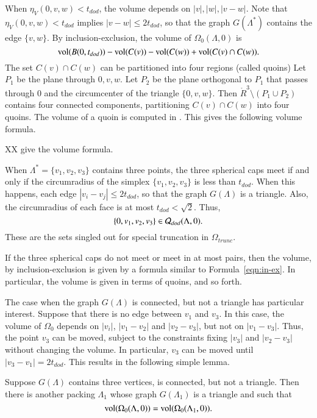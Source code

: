 When $\eta_V(0,v,w) < t_{dod}$, the volume depends on
$|v|,|w|,|v-w|$.  Note that $\eta_V(0,v,w) < t_{dod}$ implies
$|v-w|\le 2t_{dod}$, so that the graph $G(\Lambda^*)$ contains
the edge $\{v,w\}$.
By inclusion-exclusion, the volume of $\Omega_0(\Lambda,0)$ is
   \begin{equation}\label{eqn:in-ex}
   {\operatorname{vol}}(B(0,t_{dod})) - {\operatorname{vol}}(C(v)) - {\operatorname{vol}}(C(w)) +
 {\operatorname{vol}}(C(v) \cap C(w)).
   \end{equation}
The set $C(v)\cap C(w)$ can be partitioned
into four regions (called quoins)
Let $P_1$ be the plane through $0,v,w$.  Let $P_2$ be the
plane orthogonal to $P_1$ that passes through $0$ and the circumcenter
of the triangle $\{0,v,w\}$.  Then $\ring{R}^3\setminus (P_1\cup P_2)$ 
contains four connected components, partitioning $C(v)\cap C(w)$
into four quoins.  The volume of a quoin is computed in \cite[7.3]{DCG}.
This gives the following volume formula.

XX give the volume formula.

When $\Lambda^*=\{v_1,v_2,v_3\}$ contains three points, the three spherical
caps meet if and only if the circumradius of the simplex
$\{v_1,v_2,v_3\}$ is less than $t_{dod}$.  When this happens, each
edge $|v_i-v_j|\le 2t_{dod}$, so that the graph $G(\Lambda)$ is a
triangle.  Also, the circumradius of each face is at most
$t_{dod} < \sqrt2$.  Thus, 
  $$\{0,v_1,v_2,v_3\}\in{\mathcal Q}_{dod}(\Lambda,0).$$
These are the sets singled out for special truncation in $\Omega_{trunc}$.

If the three spherical caps do not meet or meet in at most pairs,
then the volume, by inclusion-exclusion is given by a formula
similar to Formula~\ref{eqn:in-ex}.  In particular, the volume
is given in terms of quoins, and so forth.

The case when the graph $G(\Lambda)$ is connected, but not a triangle
has particular interest.  Suppose that there is no edge between
$v_1$ and $v_3$. In this case, the volume of $\Omega_0$ depends on
$|v_i|$, $|v_1-v_2|$ and $|v_2-v_3|$, but not on $|v_1-v_3|$.
Thus, the point $v_3$ can be moved, subject to the constraints
fixing $|v_3|$ and $|v_2-v_3|$ without changing the volume.
In particular, $v_3$ can be moved until $|v_3-v_1|=2t_{dod}$.  This
results in the following simple lemma.  

\begin{lemma}\label{lemma:3tri}  
Suppose $G(\Lambda)$ contains three vertices,
is connected, but not a triangle.  Then there is another packing
$\Lambda_1$ whose graph $G(\Lambda_1)$ is a triangle and such
that
  $$
  {\operatorname{vol}}(\Omega_0(\Lambda,0)) = {\operatorname{vol}}(\Omega_0(\Lambda_1,0)).
  $$
\end{lemma}

